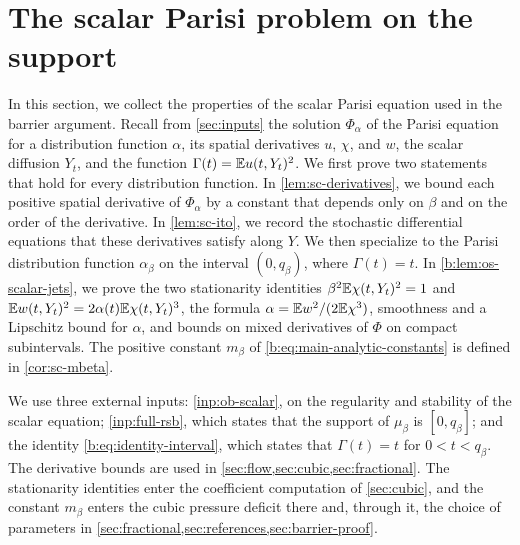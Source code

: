 \chapter{The scalar Parisi problem on the support}\label{sec:scalar}

In this section, we collect the properties of the scalar Parisi equation used
in the barrier argument. Recall from \cref{sec:inputs} the solution
$\Phi_\alpha$ of the Parisi equation for a distribution function $\alpha$,
its spatial derivatives $u$, $\chi$, and $w$, the scalar diffusion $Y_t$,
and the function $\Gamma(t)=\mathbb E u(t,Y_t)^2$. We first prove two statements
that hold for every distribution function. In \cref{lem:sc-derivatives}, we
bound each positive spatial derivative of $\Phi_\alpha$ by a constant that
depends only on $\beta$ and on the order of the derivative. In
\cref{lem:sc-ito}, we record the stochastic differential equations that these
derivatives satisfy along $Y$. We then specialize to the Parisi distribution
function $\alpha_\beta$ on the interval $(0,q_\beta)$, where $\Gamma(t)=t$.
In \cref{b:lem:os-scalar-jets}, we prove the two stationarity identities
$\beta^2\mathbb E\chi(t,Y_t)^2=1$ and $\mathbb E w(t,Y_t)^2=2\alpha(t)\mathbb E\chi(t,Y_t)^3$,
the formula $\alpha=\mathbb E w^2/(2\mathbb E\chi^3)$, smoothness and a Lipschitz bound for
$\alpha$, and bounds on mixed derivatives of $\Phi$ on compact subintervals.
The positive constant $m_\beta$ of \eqref{b:eq:main-analytic-constants} is
defined in \cref{cor:sc-mbeta}.

We use three external inputs: \cref{inp:ob-scalar}, on the regularity and
stability of the scalar equation; \cref{inp:full-rsb}, which states that the
support of $\mu_\beta$ is $[0,q_\beta]$; and the identity
\eqref{b:eq:identity-interval}, which states that $\Gamma(t)=t$ for
$0<t<q_\beta$. The derivative bounds are used in
\cref{sec:flow,sec:cubic,sec:fractional}. The stationarity identities enter
the coefficient computation of \cref{sec:cubic}, and the constant $m_\beta$
enters the cubic pressure deficit there and, through it, the choice of
parameters in \cref{sec:fractional,sec:references,sec:barrier-proof}.

